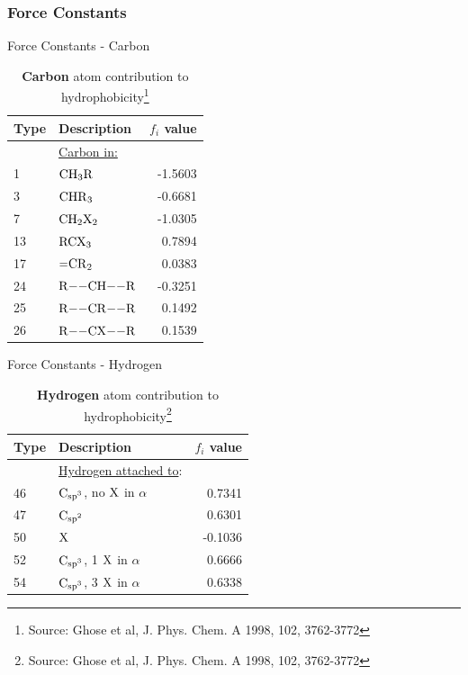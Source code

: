\documentclass{beamer}
\begin{document}
\subsubsection{Force Constants}
\begin{frame}{Force Constants - Carbon}
    \centering
        \begin{table}[H]
            \caption{\textbf{Carbon} atom contribution to hydrophobicity\footnote{Source: Ghose et al, J. Phys. Chem. A 1998, 102, 3762-3772}}
            \begin{tabular}{l l r}
                Type & Description & $f_i$ value \\
                \hline
                & \underline{Carbon in:} &         \\
                1   & $\ce{CH_{3}R}$     & -1.5603 \\
                3   & $\ce{CHR_{3}}$     & -0.6681 \\
                7   & $\ce{CH_{2}X_{2}}$ & -1.0305 \\
                13  & $\ce{RCX_{3}}$     &  0.7894 \\
                17  & $\ce{=CR_{2}}$     &  0.0383 \\
                24  & $\ce{R--CH--R}$    & -0.3251 \\
                25  & $\ce{R--CR--R}$    &  0.1492 \\
                26  & $\ce{R--CX--R}$    &  0.1539 \\
                \hline
            \end{tabular}
        \end{table}
\end{frame}
\begin{frame}{Force Constants - Hydrogen}
    \centering
        \begin{table}[H]
            \caption{\textbf{Hydrogen} atom contribution to hydrophobicity\footnote{Source: Ghose et al, J. Phys. Chem. A 1998, 102, 3762-3772}}
            \begin{tabular}{l l r}
                Type & Description & $f_i$ value \\
                \hline
                & \underline{Hydrogen attached to}:              &         \\
                46  & $\ce{C_{sp^{3}}}$, no $\ce{X}$ in $\alpha$ &  0.7341 \\
                47  & $\ce{C_{sp^{2}}}$                          &  0.6301 \\
                50  & $\ce{X}$                                   & -0.1036 \\
                52  & $\ce{C_{sp^{3}}}$, 1 $\ce{X}$ in $\alpha$  &  0.6666 \\
                54  & $\ce{C_{sp^{3}}}$, 3 $\ce{X}$ in $\alpha$  &  0.6338 \\
                \hline
            \end{tabular}
        \end{table}
\end{frame}
\end{document}

